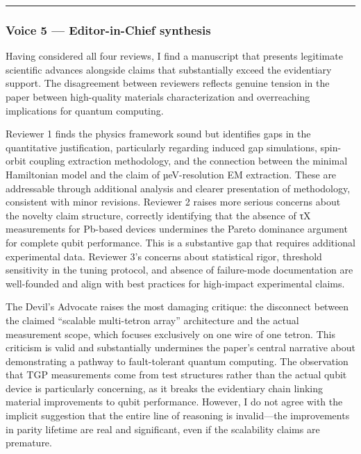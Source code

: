 \documentclass[10pt,letterpaper]{article}
\begin{document}
\begin{center}\rule{0.5\linewidth}{0.5pt}\end{center}

\hypertarget{voice-5-editor-in-chief-synthesis}{%
\subsubsection{Voice 5 --- Editor-in-Chief synthesis}\label{voice-5-editor-in-chief-synthesis}}

Having considered all four reviews, I find a manuscript that presents legitimate scientific advances alongside claims that substantially exceed the evidentiary support. The disagreement between reviewers reflects genuine tension in the paper between high-quality materials characterization and overreaching implications for quantum computing.

Reviewer 1 finds the physics framework sound but identifies gaps in the quantitative justification, particularly regarding induced gap simulations, spin-orbit coupling extraction methodology, and the connection between the minimal Hamiltonian model and the claim of µeV-resolution EM extraction. These are addressable through additional analysis and clearer presentation of methodology, consistent with minor revisions. Reviewer 2 raises more serious concerns about the novelty claim structure, correctly identifying that the absence of τX measurements for Pb-based devices undermines the Pareto dominance argument for complete qubit performance. This is a substantive gap that requires additional experimental data. Reviewer 3's concerns about statistical rigor, threshold sensitivity in the tuning protocol, and absence of failure-mode documentation are well-founded and align with best practices for high-impact experimental claims.

The Devil's Advocate raises the most damaging critique: the disconnect between the claimed ``scalable multi-tetron array'' architecture and the actual measurement scope, which focuses exclusively on one wire of one tetron. This criticism is valid and substantially undermines the paper's central narrative about demonstrating a pathway to fault-tolerant quantum computing. The observation that TGP measurements come from test structures rather than the actual qubit device is particularly concerning, as it breaks the evidentiary chain linking material improvements to qubit performance. However, I do not agree with the implicit suggestion that the entire line of reasoning is invalid---the improvements in parity lifetime are real and significant, even if the scalability claims are premature.
\end{document}
